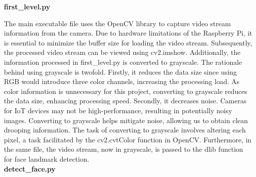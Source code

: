 \textbf{first\_level.py}

The main executable file uses the OpenCV library to capture video stream information from the camera. Due to hardware limitations of the Raspberry Pi, it is essential to minimize the buffer size for loading the video stream. Subsequently, the processed video stream can be viewed using cv2.imshow. Additionally, the information processed in first\_level.py is converted to grayscale. The rationale behind using grayscale is twofold. Firstly, it reduces the data size since using RGB would introduce three color channels, increasing the processing load. As color information is unnecessary for this project, converting to grayscale reduces the data size, enhancing processing speed. Secondly, it decreases noise. Cameras for IoT devices may not be high-performance, resulting in potentially noisy images. Converting to grayscale helps mitigate noise, allowing us to obtain clean drooping information. The task of converting to grayscale involves altering each pixel, a task facilitated by the cv2.cvtColor function in OpenCV. Furthermore, in the same file, the video stream, now in grayscale, is passed to the dlib function for face landmark detection.\\


\textbf{detect\_face.py}

